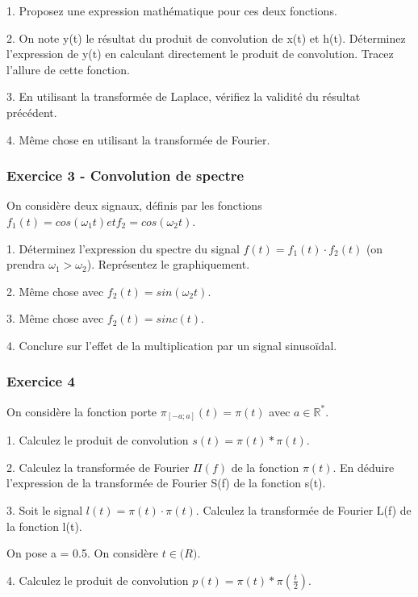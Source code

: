 	1. Proposez une expression mathématique pour ces deux fonctions.
	
	2. On note y(t) le résultat du produit de convolution de x(t) et h(t). Déterminez l'expression de y(t) en calculant directement le produit de convolution. Tracez l'allure de cette fonction.
	
	3. En utilisant la transformée de Laplace, vérifiez la validité du résultat précédent.
	
	4. Même chose en utilisant la transformée de Fourier.

	
	\vspace{1\baselineskip}
	
	\subsubsection{Exercice 3 - Convolution de spectre}
	
	On considère deux signaux, définis par les fonctions $f_{1}(t) = cos(\omega_{1}t) et f_{2} = cos(\omega_{2}t)$. 
	
	1. Déterminez l'expression du spectre du signal $f(t)=f_{1}(t)\cdot f_{2}(t)$ (on prendra $\omega_{1} > \omega_{2}$). Représentez le graphiquement.
	
	2. Même chose avec $f_{2}(t) = sin(\omega_{2}t)$.
	
	3. Même chose avec $f_{2}(t) = sinc(t)$.
	
	4. Conclure sur l'effet de la multiplication par un signal sinusoïdal.
	
	\vspace{1\baselineskip}
	
	
	\subsubsection{Exercice 4}
	
	On considère la fonction porte $\pi_{[-a;a]}(t)=\pi(t)$ avec $a \in \mathbb{R^{*}}$.
	
	1. Calculez le produit de convolution $s(t)=\pi(t)*\pi(t)$.
	
	2. Calculez la transformée de Fourier $\Pi(f)$ de la fonction $\pi(t)$. En déduire l'expression de la transformée de Fourier S(f) de la fonction s(t).
	
	3. Soit le signal $l(t)=\pi(t) \cdot \pi(t)$. Calculez la transformée de Fourier L(f) de la fonction l(t).
	
	On pose a = 0.5. On considère $t \in \mathbb(R)$.
	
	4. Calculez le produit de convolution $p(t)=\pi(t)*\pi(\frac{t}{2})$.
	
